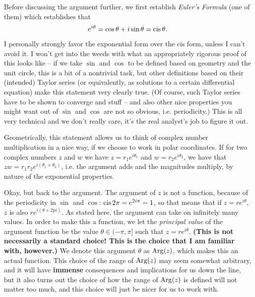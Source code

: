 Before discussing the argument further, we first establish \textit{Euler's Formula} (one of them) which establishes that
\[
    e^{i\theta} = \cos \theta + i \sin \theta = \operatorname{cis} \theta.
\]
I personally strongly favor the exponential form over the cis form, unless I can't avoid it. I won't get into the weeds with what an appropriately rigorous proof of this looks like -- if we take $\sin$ and $\cos$ to be defined based on geometry and the unit circle, this is a bit of a nontrivial task, but other definitions based on their (intended) Taylor series (or equivalently, as solutions to a certain differential equation) make this statement very clearly true. (Of course, such Taylor series have to be shown to converge and stuff -- and also other nice properties you might want out of $\sin$ and $\cos$ are not so obvious, i.e. periodicity.) This is all very technical and we don't really care, it's the real analyst's job to figure it out.


Geometrically, this statement allows us to think of complex number multiplication in a nice way, if we choose to work in polar coordinates. If for two complex numbers $z$ and $w$ we have $z = r_1 e^{i\theta_1}$ and $w = r_2 e^{i\theta_2}$, we have that $zw = r_1 r_2 e^{i (\theta_1 + \theta_2)}$, i.e. the argument adds and the magnitudes multiply, by nature of the exponential properties.

Okay, but back to the argument. The argument of $z$ is not a function, because of the periodicity in $\sin$ and $\cos$: $\operatorname{cis} 2\pi = e^{2i \pi} = 1$, so that means that if $z = re^{i\theta}$, $z$ is also $re^{i(\theta + 2pi)}$. As stated here, the argument can take on infinitely many values. In order to make this a function, we let the \textit{principal value} of the argument function be the value $\theta \in (-\pi, \pi]$ such that $z = re^{i\theta}$. \textbf{(This is not necessarily a standard choice! This is the choice that I am familiar with, however.)} We denote this argument $\theta$ as $\operatorname*{Arg}(z)$, which makes this an actual function. This choice of the range of $\operatorname*{Arg}(z)$ may seem somewhat arbitrary, and it will have \textbf{immense} consequences and implications for us down the line, but it also turns out the choice of how the range of $\operatorname*{Arg}(z)$ is defined will not matter too much, and this choice will just be nicer for us to work with.

